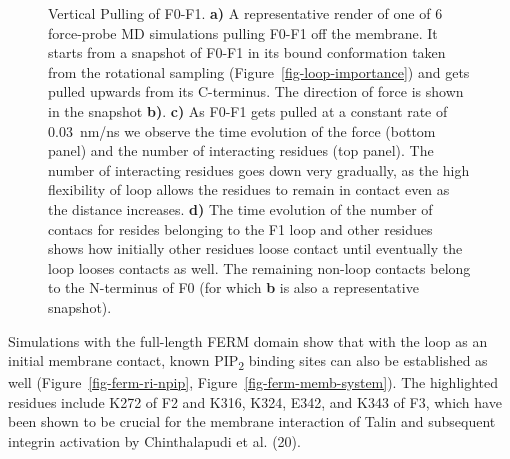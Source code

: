\documentclass[
  letterpaper,
  DIV=11,
  numbers=noendperiod]{scrartcl}
\begin{document}
\begin{figure}
\begin{minipage}[t]{0.50\linewidth}
\subcaption{\label{fig-f0f1-vert-pull-contacts}~}
\end{minipage}%

\caption{\label{fig-vert-pull}Vertical Pulling of F0-F1. \textbf{a)} A
representative render of one of 6 force-probe MD simulations pulling
F0-F1 off the membrane. It starts from a snapshot of F0-F1 in its bound
conformation taken from the rotational sampling
(Figure~\ref{fig-loop-importance}) and gets pulled upwards from its
C-terminus. The direction of force is shown in the snapshot \textbf{b)}.
\textbf{c)} As F0-F1 gets pulled at a constant rate of 0.03~nm/ns we
observe the time evolution of the force (bottom panel) and the number of
interacting residues (top panel). The number of interacting residues
goes down very gradually, as the high flexibility of loop allows the
residues to remain in contact even as the distance increases.
\textbf{d)} The time evolution of the number of contacs for resides
belonging to the F1 loop and other residues shows how initially other
residues loose contact until eventually the loop looses contacts as
well. The remaining non-loop contacts belong to the N-terminus of F0
(for which \textbf{b} is also a representative snapshot).}

\end{figure}

Simulations with the full-length FERM domain show that with the loop as
an initial membrane contact, known PIP\textsubscript{2} binding sites
can also be established as well
(Figure~\ref{fig-ferm-ri-npip}, Figure~\ref{fig-ferm-memb-system}). The
highlighted residues include K272 of F2 and K316, K324, E342, and K343
of F3, which have been shown to be crucial for the membrane interaction
of Talin and subsequent integrin activation by Chinthalapudi et al.
(20).
\end{document}
